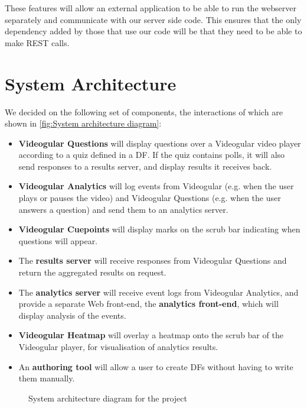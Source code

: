 These features will allow an external application to be able to run the webserver separately and communicate with our server side code. This ensures that the only dependency added by those that use our code will be that they need to be able to make \gls{REST} calls.

\section{System Architecture}

We decided on the following set of components, the interactions of which are shown in \autoref{fig:System architecture diagram}:

\begin{itemize}
	\item
		\textbf{Videogular Questions} will display questions over a \gls{Videogular} video player according to a quiz defined in a \gls{DF}. If the quiz contains polls, it will also send responses to a results server, and display results it receives back.
	\item
		\textbf{Videogular Analytics} will log events from \gls{Videogular} (e.g. when the user plays or pauses the video) and Videogular Questions (e.g. when the user answers a question) and send them to an analytics server.
	\item
		\textbf{Videogular Cuepoints} will display marks on the scrub bar indicating when questions will appear.
	\item
		The \textbf{results server} will receive responses from Videogular Questions and return the aggregated results on request.
	\item
		The \textbf{analytics server} will receive event logs from Videogular Analytics, and provide a separate Web front-end, the \textbf{analytics front-end}, which will display analysis of the events.
	\item
		\textbf{Videogular Heatmap} will overlay a heatmap onto the scrub bar of the \gls{Videogular} player, for visualisation of analytics results.
	\item
		An \textbf{authoring tool} will allow a user to create \glspl{DF} without having to write them manually.
\end{itemize}

\begin{figure}[h!]
\centering

\caption{System architecture diagram for the project \label{fig:System architecture diagram}}
\end{figure}

